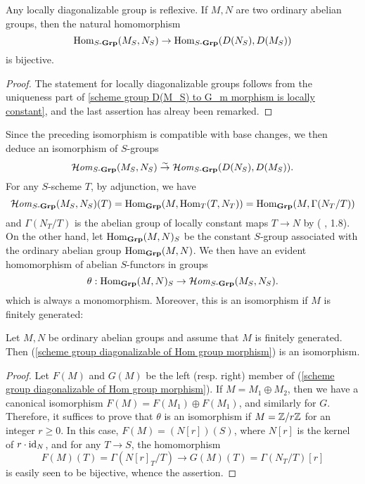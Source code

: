 \begin{corollary}\label{scheme group locally diagonalizable reflexive}
Any locally diagonalizable group is reflexive. If $M,N$ are two ordinary abelian groups, then the natural homomorphism
\[\mathrm{Hom}_{S\textup{-}\mathbf{Grp}}(M_S,N_S)\to\mathrm{Hom}_{S\textup{-}\mathbf{Grp}}(D(N_S),D(M_S))\]
is bijective.
\end{corollary}
\begin{proof}
The statement for locally diagonalizable groups follows from the uniqueness part of \cref{scheme group D(M_S) to G_m morphism is locally constant}, and the last assertion has alreay been remarked.
\end{proof}

Since the preceding isomorphism is compatible with base changes, we then deduce an isomorphism of $S$-groups
\begin{equation}\label{scheme group diagonalizable sHom isomorphism by D}
\operatorname{\mathcal{H}\hspace*{-0.4pt}\textit{om}\hspace{0.5pt}}_{S\textup{-}\mathbf{Grp}}(M_S,N_S)\stackrel{\sim}{\to} \operatorname{\mathcal{H}\hspace*{-0.4pt}\textit{om}\hspace{0.5pt}}_{S\textup{-}\mathbf{Grp}}(D(N_S),D(M_S)).
\end{equation}
For any $S$-scheme $T$, by adjunction, we have
\begin{equation}\label{scheme sHom of constant group char by global section}
\operatorname{\mathcal{H}\hspace*{-0.4pt}\textit{om}\hspace{0.5pt}}_{S\textup{-}\mathbf{Grp}}(M_S,N_S)(T)=\mathrm{Hom}_{\mathbf{Grp}}(M,\mathrm{Hom}_{T}(T,N_T))=\mathrm{Hom}_{\mathbf{Grp}}(M,\Gamma(N_T/T))
\end{equation}
and $\Gamma(N_T/T)$ is the abelian group of locally constant maps $T\to N$ by (\cite{SGA3-1} , 1.8). On the other hand, let $\mathrm{Hom}_{\mathbf{Grp}}(M,N)_S$ be the constant $S$-group associated with the ordinary abelian group $\mathrm{Hom}_{\mathbf{Grp}}(M,N)$. We then have an evident homomorphism of abelian $S$-functors in groups
\begin{equation}\label{scheme group diagonalizable of Hom group morphism}
\theta:\mathrm{Hom}_{\mathbf{Grp}}(M,N)_S\to \operatorname{\mathcal{H}\hspace*{-0.4pt}\textit{om}\hspace{0.5pt}}_{S\textup{-}\mathbf{Grp}}(M_S,N_S).
\end{equation}
which is always a monomorphism. Moreover, this is an isomorphism if $M$ is finitely generated:

\begin{proposition}\label{scheme group diagonalizable of Hom isomorphism if ft}
Let $M,N$ be ordinary abelian groups and assume that $M$ is finitely generated. Then (\ref{scheme group diagonalizable of Hom group morphism}) is an isomorphism.
\end{proposition}
\begin{proof}
Let $F(M)$ and $G(M)$ be the left (resp. right) member of (\ref{scheme group diagonalizable of Hom group morphism}). If $M=M_1\oplus M_2$, then we have a canonical isomorphism $F(M)=F(M_1)\oplus F(M_1)$, and similarly for $G$. Therefore, it suffices to prove that $\theta$ is an isomorphism if $M=\mathbb{Z}/r\mathbb{Z}$ for an integer $r\geq 0$. In this case, $F(M)=(N[r])(S)$, where $N[r]$ is the kernel of $r\cdot\operatorname{id}_N$, and for any $T\to S$, the homomorphism
\[F(M)(T)=\Gamma(N[r]_T/T)\to G(M)(T)=\Gamma(N_T/T)[r]\]
is easily seen to be bijective, whence the assertion.
\end{proof}

